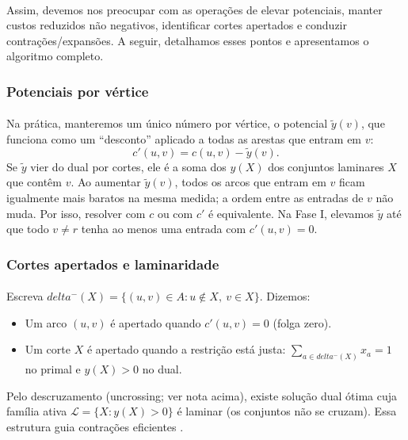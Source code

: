\documentclass[12pt,a4paper]{article}
\def\emph#1{#1}%
\def\delta{delta}%
\begin{document}
\paragraph{}
Assim, devemos nos preocupar com as operações de elevar potenciais, manter custos reduzidos não negativos, identificar cortes apertados e conduzir contrações/expansões. A seguir, detalhamos esses pontos e apresentamos o algoritmo completo.

\subsubsection{Potenciais por vértice}
\paragraph{}
Na prática, manteremos um único número por vértice, o \emph{potencial} \(\tilde y(v)\), que funciona como um “desconto” aplicado a todas as arestas que entram em \(v\):
\[
    c'(u,v) = c(u,v) - \tilde y(v).
\]
Se \(\tilde y\) vier do dual por cortes, ele é a soma dos \(y(X)\) dos conjuntos laminares \(X\) que contêm \(v\). Ao aumentar \(\tilde y(v)\), todos os arcos que entram em \(v\) ficam igualmente mais baratos na mesma medida; a ordem entre as entradas de \(v\) não muda. Por isso, resolver com \(c\) ou com \(c'\) é equivalente. Na Fase I, elevamos \(\tilde y\) até que todo \(v\neq r\) tenha ao menos uma entrada com \(c'(u,v)=0\).

\subsubsection{Cortes apertados e laminaridade}
\paragraph{}
Escreva \(\delta^-(X)=\{(u,v)\in A: u\notin X,\ v\in X\}\). Dizemos:
\begin{itemize}\setlength{\itemsep}{1pt}
    \item Um arco \((u,v)\) é \emph{apertado} quando \(c'(u,v)=0\) (folga zero).
    \item Um corte \(X\) é \emph{apertado} quando a restrição está \emph{justa}: \(\sum_{a\in \delta^-(X)} x_a=1\) no primal e \(y(X)>0\) no dual.
\end{itemize}
Pelo descruzamento (\emph{uncrossing}; ver nota acima), existe solução dual ótima cuja família ativa \(\mathcal{L}=\{X: y(X)>0\}\) é \emph{laminar} (os conjuntos não se cruzam). Essa estrutura guia contrações eficientes \cite{frank2014,schrijver2003comb}. 
\end{document}
